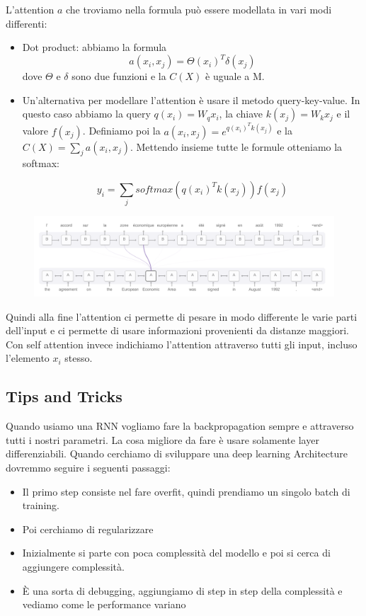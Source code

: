\documentclass[14pt]{extreport}
\begin{document}
L'attention $a$ che troviamo nella formula può essere modellata in vari modi differenti:
\begin{itemize}
\item Dot product: abbiamo la formula $$a(x_i, x_j) = \Theta(x_i)^T\delta(x_j)$$ dove $\Theta$ e $\delta$ sono due funzioni
e la $C(X)$ è uguale a M.
\item Un'alternativa per modellare l'attention è usare il metodo query-key-value.
In questo caso abbiamo la query $q(x_i) = W_qx_i$, la chiave $k(x_j)=W_kx_j$ e il valore $f(x_j)$.
Definiamo poi la $a(x_i,x_j) = e^{q(x_i)^Tk(x_j)}$ e la $C(X)=\sum_ja(x_i, x_j)$.
Mettendo insieme tutte le formule otteniamo la softmax:

$$y_i = \sum_j softmax(q(x_i)^Tk(x_j))f(x_j)$$
\end{itemize}

\begin{figure}[H]
\centering
\includegraphics[width=0.7\linewidth]{431.jpeg}
\end{figure}

Quindi alla fine l'attention ci permette di pesare in modo differente le varie parti dell'input 
e ci permette di usare informazioni provenienti da distanze maggiori.
Con self attention invece indichiamo l'attention attraverso tutti gli input, incluso l'elemento $x_i$ stesso.

\subsection{Tips and Tricks}

Quando usiamo una RNN vogliamo fare la backpropagation sempre e attraverso tutti i nostri parametri.
La cosa migliore da fare è usare solamente layer differenziabili.
Quando cerchiamo di sviluppare una deep learning Architecture dovremmo seguire i seguenti passaggi:
\begin{itemize}
\item Il primo step consiste nel fare overfit, quindi prendiamo un singolo batch di training.
\item Poi cerchiamo di regularizzare 
\item Inizialmente si parte con poca complessità del modello e poi si cerca di aggiungere complessità.
\item È una sorta di debugging, aggiungiamo di step in step della complessità e vediamo come le performance variano

\end{itemize}
\end{document}
